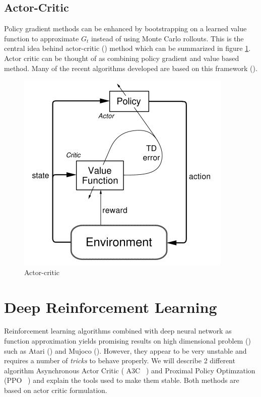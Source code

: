 \subsection{Actor-Critic}
Policy gradient methods can be enhanced by bootstrapping on a learned value function to approximate $G_t$ instead of using Monte Carlo rollouts. This is the central idea behind actor-critic (\cite{konda2000actor}) method which can be summarized in figure \ref{fig:actor_critic}. Actor critic can be thought of as combining policy gradient and value based method. Many of the recent algorithms developed are based on this framework (\cite{mnih2016asynchronous,schulman2017proximal,wu2017scalable}).
\begin{figure}
    \centering
    \includegraphics[scale=0.6]{fig/actor_critic.png}
    \caption{Actor-critic}
    \label{fig:actor_critic}
\end{figure}
\section{Deep Reinforcement Learning} %
Reinforcement learning algorithms combined with deep neural network as function approximation yields promising results on high dimensional problem (\cite{mnih2013playing,mnih2016asynchronous,schulman2017proximal}) such as Atari (\cite{bellemare2013arcade}) and Mujoco (\cite{todorov2012mujoco}). However, they appear to be very unstable and requires a number of \emph{tricks} to behave properly. We will describe 2 different algorithm Asynchronous Actor Critic ( A3C ~\cite{mnih2016asynchronous}) and Proximal Policy Optimzation (PPO ~\cite{schulman2017proximal}) and explain the tools used to make them stable. Both methods are based on actor critic formulation. 
